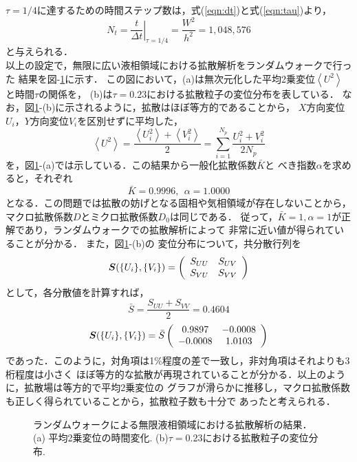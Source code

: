 $\tau=1/4$に達するための時間ステップ数は，式(\ref{eqn:dt})と式(\ref{eqn:tau})より，
\begin{equation}
	N_t=\left. \frac{t}{\Delta t} \right|_{\tau=1/4}=\frac{W^2}{h^2}=1,048,576
\end{equation}
と与えられる．\\
\hspace{\parindent}
以上の設定で，無限に広い液相領域における拡散解析をランダムウォークで行った
結果を図-\ref{fig:rwk0}に示す．
この図において，(a)は無次元化した平均2乗変位$\left<U^2\right>$と時間$\tau$の関係を，
(b)は$\tau=0.23$における拡散粒子の変位分布を表している．
なお，図\ref{fig:rwk0}-(b)に示されるように，拡散はほぼ等方的であることから，
$X$方向変位$U_i$，$Y$方向変位$V_i$を区別せずに平均した，
\begin{equation}
	\left< U^2 \right>=\frac{
			\left<U_i^2 \right>
		+
		\left<V_i^2 \right>
	}{2}
	=\sum_{i=1}^{N_p}
	\frac{U_i^2+V_i^2}{2N_p}
	\label{eqn:Ubar}
\end{equation}
を，図\ref{fig:rwk0}-(a)では示している．この結果から一般化拡散係数$\bar K$と
べき指数$\alpha$を求めると，それぞれ
\begin{equation}
	\bar{K}=0.9996, \ \ \alpha=1.0000
\end{equation}
となる．この問題では拡散の妨げとなる固相や気相領域が存在しないことから，
マクロ拡散係数$D$とミクロ拡散係数$D_0$は同じである．
従って，$\bar K=1, \alpha=1$が正解であり，ランダムウォークでの拡散解析によって
非常に近い値が得られていることが分かる．
また，図\ref{fig:rwk0}-(b)の
変位分布について，共分散行列を
\begin{equation}
	\mbox{\boldmath{$S$}}( \{U_i\},\{V_i\})
	=\left(
	\begin{array}{cc}
		S_{UU} & S_{UV}	 \\
		S_{VU} & S_{VV} 	
	\end{array}
	\right)
\end{equation}
として，各分散値を計算すれば，
\begin{equation}
	\bar{S}= \frac{S_{UU}+S_{VV}}{2}=0.4604
\end{equation}
\begin{equation}
	\mbox{\boldmath{$S$}}( \{U_i\},\{V_i\})
	=
	\bar{S}
	\left(
	\begin{array}{cc}
		 0.9897 & -0.0008 \\
		-0.0008 &  1.0103
	\end{array}
	\right)
\end{equation}
であった．このように，対角項は1$\%$程度の差で一致し，非対角項はそれよりも3桁程度は小さく
ほぼ等方的な拡散が再現されていることが分かる．以上のように，拡散場は等方的で平均2乗変位の
グラフが滑らかに推移し，マクロ拡散係数も正しく得られていることから，拡散粒子数も十分で
あったと考えられる．
\begin{figure}[t]
\begin{center}
\caption{
	ランダムウォークによる無限液相領域における拡散解析の結果．
	(a) 平均2乗変位の時間変化. (b)$\tau=$0.23における拡散粒子の変位分布. 
}
\label{fig:rwk0}
\end{center}
\end{figure}

